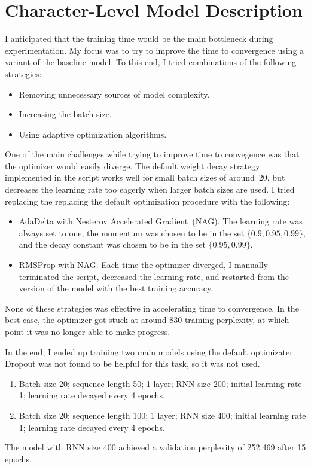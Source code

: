 \documentclass[11pt,a4paper]{article}
\begin{document}
\section{Character-Level Model Description}

I anticipated that the training time would be the main bottleneck during
experimentation. My focus was to try to improve the time to convergence using a
variant of the baseline model. To this end, I tried combinations of the
following strategies:
\begin{itemize}
\item Removing unnecessary sources of model complexity.
\item Increasing the batch size.
\item Using adaptive optimization algorithms.
\end{itemize}

One of the main challenges while trying to improve time to convegence was that
the optimizer would easily diverge. The default weight decay strategy
implemented in the script works well for small batch sizes of around~20, but
decreases the learning rate too eagerly when larger batch sizes are used. I
tried replacing the replacing the default optimization procedure with the
following:
\begin{itemize}
\item AdaDelta with Nesterov Accelerated Gradient~(NAG). The learning rate was
always set to one, the momentum was chosen to be in the set $\{0.9, 0.95,
0.99\}$, and the decay constant was chosen to be in the set $\{0.95, 0.99\}$.
\item RMSProp with NAG. Each time the optimizer diverged, I manually terminated
the script, decreased the learning rate, and restarted from the version of the
model with the best training accuracy.
\end{itemize}
None of these strategies was effective in accelerating time to convergence. In
the best case, the optimizer got stuck at around 830 training perplexity, at
which point it was no longer able to make progress.

In the end, I ended up training two main models using the default optimizater.
Dropout was not found to be helpful for this task, so it was not used.
\begin{enumerate}
\item Batch size 20; sequence length 50; 1 layer; RNN size 200; initial learning
rate 1; learning rate decayed every 4 epochs.
\item Batch size 20; sequence length 100; 1 layer; RNN size 400; initial learning
rate 1; learning rate decayed every 4 epochs.
\end{enumerate}
The model with RNN size 400 achieved a validation perplexity of 252.469 after 15
epochs.
\end{document}
